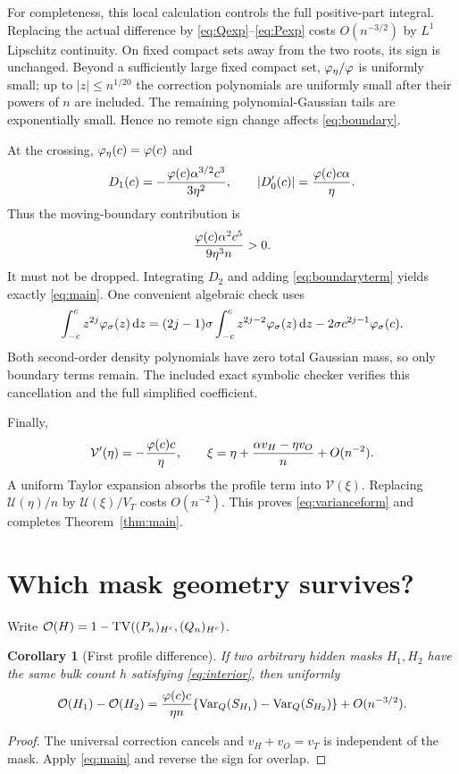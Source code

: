 \documentclass[11pt,a4paper]{article}
\newtheorem{corollary}[theorem]{Corollary}\newtheorem{proposition}[theorem]{Proposition}
\theoremstyle{remark}\newtheorem*{ednote}{Editorial note (ProveIt, 2026-10-01)}
\newcommand{\Var}{\operatorname{Var}}\newcommand{\Law}{\operatorname{Law}}\newcommand{\KL}{\operatorname{KL}}
\begin{document}
For completeness, this local calculation controls the full positive-part integral. Replacing the actual difference by \eqref{eq:Qexp}--\eqref{eq:Pexp} costs $O(n^{-3/2})$ by $L^1$ Lipschitz continuity. On fixed compact sets away from the two roots, its sign is unchanged. Beyond a sufficiently large fixed compact set, $\varphi_\eta/\varphi$ is uniformly small; up to $|z|\le n^{1/20}$ the correction polynomials are uniformly small after their powers of $n$ are included. The remaining polynomial-Gaussian tails are exponentially small. Hence no remote sign change affects \eqref{eq:boundary}.

At the crossing, $\varphi_\eta(c)=\varphi(c)$ and
\[
 D_1(c)=-\frac{\varphi(c)\alpha^{3/2}c^3}{3\eta^2},\qquad
 |D_0'(c)|=\frac{\varphi(c)c\alpha}{\eta}.
\]
Thus the moving-boundary contribution is
\begin{equation}\label{eq:boundaryterm}
 \frac{\varphi(c)\alpha^2c^5}{9\eta^3n}>0.
\end{equation}
It must not be dropped. Integrating $D_2$ and adding \eqref{eq:boundaryterm} yields exactly \eqref{eq:main}. One convenient algebraic check uses
\[
 \int_{-c}^c z^{2j}\varphi_\sigma(z)\,\mathrm d z
 =(2j-1)\sigma\int_{-c}^c z^{2j-2}\varphi_\sigma(z)\,\mathrm d z
      -2\sigma c^{2j-1}\varphi_\sigma(c).
\]
Both second-order density polynomials have zero total Gaussian mass, so only boundary terms remain. The included exact symbolic checker verifies this cancellation and the full simplified coefficient.

Finally,
\[
 \mathcal V'(\eta)=-\frac{\varphi(c)c}{\eta},\qquad
 \xi=\eta+\frac{\alpha v_H-\eta v_O}{n}+O(n^{-2}).
\]
A uniform Taylor expansion absorbs the profile term into $\mathcal V(\xi)$. Replacing $\mathcal U(\eta)/n$ by $\mathcal U(\xi)/V_T$ costs $O(n^{-2})$. This proves \eqref{eq:varianceform} and completes Theorem~\ref{thm:main}.

\section{Which mask geometry survives?}
Write $\mathcal O(H)=1-\operatorname{TV}((P_n)_{H^c},(Q_n)_{H^c})$.
\begin{corollary}[First profile difference]\label{cor:difference}
If two arbitrary hidden masks $H_1,H_2$ have the same bulk count $h$ satisfying \eqref{eq:interior}, then uniformly
\begin{equation}\label{eq:profilediff}
 \mathcal O(H_1)-\mathcal O(H_2)
 =\frac{\ph(c)c}{\eta n}
       \{\Var_Q(S_{H_1})-\Var_Q(S_{H_2})\}+O(n^{-3/2}).
\end{equation}
\end{corollary}
\begin{proof}
The universal correction cancels and $v_H+v_O=v_T$ is independent of the mask. Apply \eqref{eq:main} and reverse the sign for overlap.
\end{proof}
\end{document}
